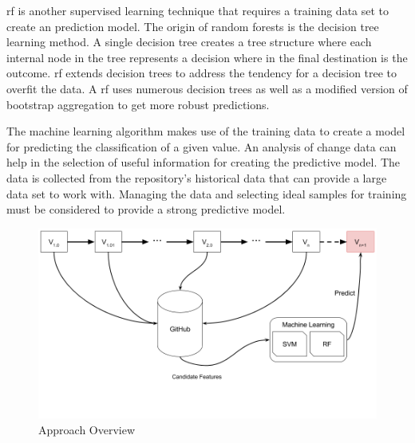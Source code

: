 \gls{rf} is another supervised learning technique that requires a training data set to create an prediction model. The origin of random forests is the decision tree learning method. A single decision tree creates a tree structure where each internal node in the tree represents a decision where in the final destination is the outcome. \gls{rf} extends decision trees to address the tendency for a decision tree to overfit the data. A \gls{rf} uses numerous decision trees as well as a modified version of bootstrap aggregation to get more robust predictions.



The machine learning algorithm makes use of the training data to create a model for predicting the classification of a given value. An analysis of change data can help in the selection of useful information for creating the predictive model. The data is collected from the repository's historical data that can provide a large data set to work with. Managing the data and selecting ideal samples for training must be considered to provide a strong predictive model.

\begin{figure}[!ht]
    \centering
        \includegraphics[width=1.0\textwidth]{images/overview}
    \caption{Approach Overview}
    \label{fig:overview}
\end{figure}

